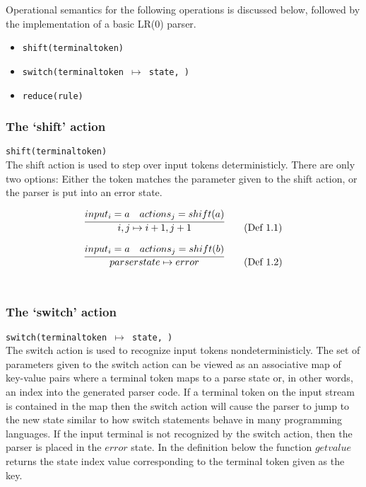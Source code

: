 \documentclass[a4paper,11pt]{article}
\begin{document}
Operational semantics for the following operations is discussed below, followed by the implementation of a basic LR(0) parser.
\begin{itemize}
\item \texttt{shift(terminaltoken)}
\item \texttt{switch(terminaltoken $\mapsto$ state, \textellipsis)}
\item \texttt{reduce(rule)}
\end{itemize}

\subsubsection{The `shift' action}
\texttt{shift(terminaltoken)}\\
The shift action is used to step over input tokens deterministicly. 
There are only two options: Either the token matches the parameter given to the shift action, or the parser is put into an error state.

\begin{equation}
\infer{i, j \mapsto i+1, j+1}{input_i = a & actions_j = shift(a)} \tag{Def 1.1}
\end{equation}

\begin{equation}
\infer{parserstate \mapsto error}{input_i = a & actions_j = shift(b)} \tag{Def 1.2}
\end{equation}\\

\subsubsection{The `switch' action}
\texttt{switch(terminaltoken $\mapsto$ state, \textellipsis)}\\
The switch action is used to recognize input tokens nondeterministicly.
The set of parameters given to the switch action can be viewed as an associative map of key-value pairs where a terminal token maps to a parse state or, in other words, an index into the generated parser code.
If a terminal token on the input stream is contained in the map then the switch action will cause the parser to jump to the new state similar to how switch statements behave in many programming languages.
If the input terminal is not recognized by the switch action, then the parser is placed in the $error$ state. 
In the definition below the function $getvalue$ returns the state index value corresponding to the terminal token given as the key.
\end{document}

